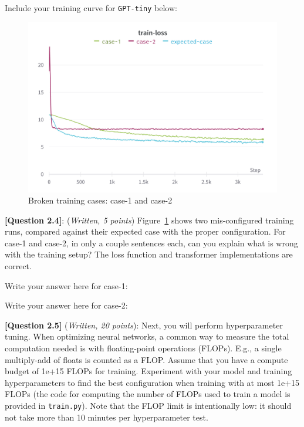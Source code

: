 \documentclass[leqno,12pt]{article}
\begin{document}
\noindent
Include your training curve for \texttt{GPT-tiny} below:
\begin{tcolorbox}[fit,height=10cm, width=12cm, blank, borderline={1pt}{-2pt}]
\end{tcolorbox}

\clearpage
\begin{figure}[h!]
    \centering
    \includegraphics[width=0.75\linewidth]{figures/fig3-q2.4-broken-training.png}
    \caption{Broken training cases: case-1 and case-2}
    \label{fig:broken-training}
\end{figure}

\noindent \textbf{[Question 2.4]}: (\emph{Written, 5 points}) 
Figure~\ref{fig:broken-training} shows two mis-configured training runs, compared against their expected case with the proper configuration. For case-1 and case-2, in only a couple sentences each, can you explain what is wrong with the training setup? The loss function and transformer implementations are correct. \newline

\noindent
Write your answer here for case-1:
\begin{tcolorbox}[fit,height=2cm, width=\linewidth, blank, borderline={1pt}{-2pt}]
\end{tcolorbox}

\noindent
Write your answer here for case-2:
\begin{tcolorbox}[fit,height=2cm, width=\linewidth, blank, borderline={1pt}{-2pt}]
\end{tcolorbox}

\noindent \textbf{[Question 2.5]} (\emph{Written, 20 points}): Next, you will perform hyperparameter tuning. When optimizing neural networks, a common way to measure the total computation needed is with floating-point operations (FLOPs). E.g., a single multiply-add of floats is counted as a FLOP.
%
Assume that you have a compute budget of 1e+15 FLOPs for training. Experiment with your model and training hyperparameters to find the best configuration when training with at most 1e+15 FLOPs (the code for computing the number of FLOPs used to train a model is provided in \texttt{train.py}). Note that the FLOP limit is intentionally low: it should not take more than 10 minutes per hyperparameter test. \newline
\end{document}
